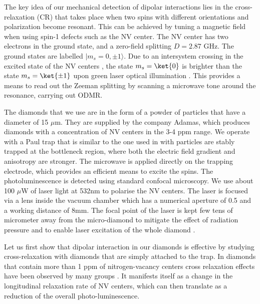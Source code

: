\documentclass[preprintnumbers,amsmath,amssymb,superscriptaddress,twocolumn,showpacs]{revtex4-1}
\begin{document}
The key idea of our mechanical detection of dipolar interactions lies in the cross-relaxation (CR) that takes place when two spins with different orientations and polarization become resonant. This can be achieved by tuning a magnetic field when using spin-1 defects such as the NV center.
The NV center has two electrons in the ground state, and a zero-field splitting $D=2.87$ GHz.
The ground states are labelled $| m_s={0}, {\pm 1}\rangle$.
Due to an intersystem crossing in the excited state of the NV centers \cite{Doherty}, the state $m_s=\ket{0}$ is brighter than the state $m_s=\ket{\pm 1}$ upon green laser optical illumination \cite{Hopper}. This provides a means to read out the Zeeman splitting by scanning a microwave tone around the resonance, carrying out ODMR.

The diamonds that we use are in the form of a powder of particles that have a diameter of 15 $\mu$m. They are supplied by the company Adamas, which produces diamonds with a concentration of NV centers in the 3-4 ppm range. 
We operate with a Paul trap that is similar to the one used in \cite{delordPRL} with particles are stably trapped at the bottleneck region, where both the electric field gradient and anisotropy are stronger.
The microwave is applied directly on the trapping electrode, which provides an efficient means to excite the spins.
The photoluminescence is detected using standard confocal microscopy. We use about 100 $\mu$W of laser light at 532nm to polarise the NV centers. The laser is focused via a lens inside the vacuum chamber which has a numerical aperture of 0.5 and a working distance of 8mm. The focal point of the laser is kept few tens of micrometer away from the micro-diamond to mitigate the effect of radiation pressure and to enable laser excitation of the whole diamond \cite{delordPRL,delord2016}. 

Let us first show that dipolar interaction in our diamonds is effective by studying cross-relaxation with diamonds that are simply attached to the trap.
In diamonds that contain more than 1 ppm of nitrogen-vacancy centers cross relaxation effects have been observed by many groups \cite{van_oort_cross-relaxation_1989, armstrong_nvnv_2010, jarmola_longitudinal_2015, akhmedzhanov_microwave-free_2017, akhmedzhanov_magnetometry_2019, holliday_optical_1989, mrozek_longitudinal_2015, jarmola_temperature-_2012, choi_depolarization_2017}.
It manifests itself as a change in the longitudinal relaxation rate of NV centers, which can then translate as a reduction of the overall photo-luminescence. 
\end{document}
